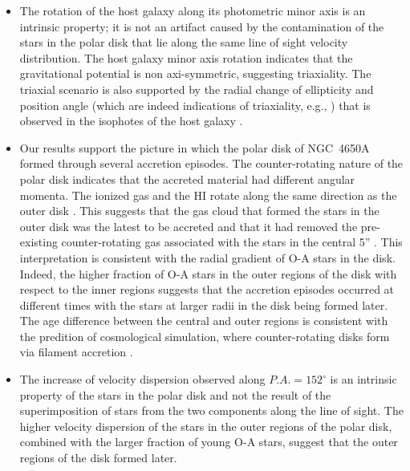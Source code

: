 \documentclass{aa}
\begin{document}
\begin{itemize}


\item The rotation of the host galaxy along its photometric minor axis
  is an intrinsic property; it is not an artifact caused by the
  contamination of the stars in the polar disk that lie along the same
  line of sight velocity distribution. The host galaxy minor axis
  rotation indicates that the gravitational potential is non
  axi-symmetric, suggesting triaxiality.  The triaxial scenario is
    also supported by the radial change of ellipticity and position
    angle (which are indeed indications of triaxiality,
    e.g., \citealt{Binney78, Bertola+79}) that is observed in the isophotes of
    the host galaxy \citep{Iodice+06}.

  \item Our results support the picture in which the polar disk of
    NGC~4650A formed through several accretion episodes. The
    counter-rotating nature of the polar disk indicates that the
    accreted material had different angular momenta. The ionized gas
    and the H{\small I} rotate along the same direction as the outer
    disk \citep{Whitmore+87, VanGorkom+87, Arnaboldi1997}. This
    suggests that the gas cloud that formed the stars in the outer
    disk was the latest to be accreted and that it had removed the
    pre-existing counter-rotating gas associated with the stars in the
    central 5'' \citep{Thakar+96, Pizzella+04}. This interpretation is
    consistent with the radial gradient of O-A stars in the
    disk. Indeed, the higher fraction of O-A stars in the outer
    regions of the disk with respect to the inner regions suggests
    that the accretion episodes occurred at different times with the
    stars at larger radii in the disk being formed later. The age
    difference between the central and outer regions is consistent
    with the predition of cosmological simulation, where
    counter-rotating disks form via filament accretion
    \citep{Algorry+14}.

\item The increase of velocity dispersion observed along $P.A. =
  152^{\circ}$ is an intrinsic property of the stars in the polar
  disk and not the result of the superimposition of stars from the
  two components along the line of sight. The higher velocity
  dispersion of the stars in the outer regions of the polar disk,
  combined with the larger fraction of young O-A stars, suggest that
  the outer regions of the disk formed later.


\end{itemize}
\end{document}
